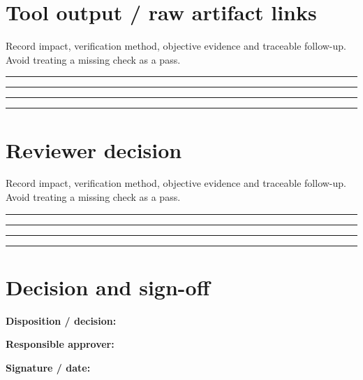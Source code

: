 \documentclass[10pt,letterpaper]{article}
\begin{document}
\section{Tool output / raw artifact links}
Record impact, verification method, objective evidence and traceable follow-up. Avoid treating a missing check as a pass.\par\medskip
\noindent\rule{\linewidth}{0.4pt}\par\vspace{16pt}
\noindent\rule{\linewidth}{0.4pt}\par\vspace{16pt}
\noindent\rule{\linewidth}{0.4pt}\par\vspace{16pt}
\noindent\rule{\linewidth}{0.4pt}\par\vspace{16pt}
\section{Reviewer decision}
Record impact, verification method, objective evidence and traceable follow-up. Avoid treating a missing check as a pass.\par\medskip
\noindent\rule{\linewidth}{0.4pt}\par\vspace{16pt}
\noindent\rule{\linewidth}{0.4pt}\par\vspace{16pt}
\noindent\rule{\linewidth}{0.4pt}\par\vspace{16pt}
\noindent\rule{\linewidth}{0.4pt}\par\vspace{16pt}
\section{Decision and sign-off}
\noindent\textbf{Disposition / decision:}\quad\hrulefill\par\vspace{11pt}
\noindent\textbf{Responsible approver:}\quad\hrulefill\par\vspace{11pt}
\noindent\textbf{Signature / date:}\quad\hrulefill\par\vspace{11pt}
\end{document}
